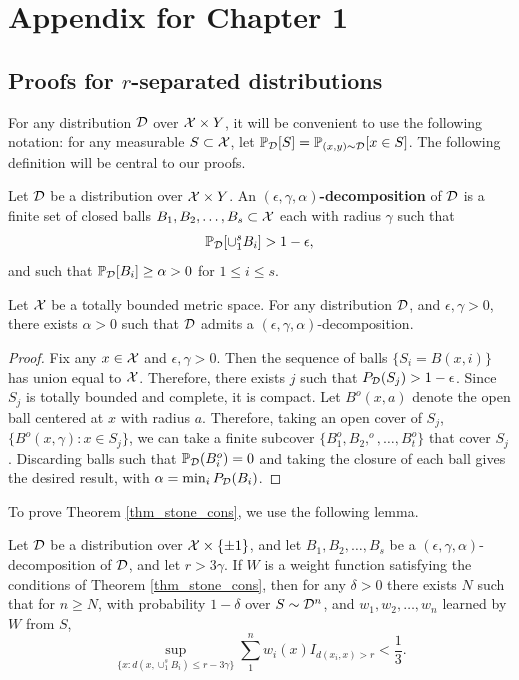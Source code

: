\graphicspath{{./chapters/chapter0/}}
\chapter{Appendix for Chapter 1}
\section{Proofs for $r$-separated distributions}

For any distribution ${\mathcal D}$ over $\mathcal X \times Y$, it will be convenient to use the following notation: for any measurable $S \subset \mathcal X$, let $\mathbb{P}_{\mathcal D}[S] = \mathbb{P}_{(x,y) \sim {\mathcal D}}[x \in S]$. The following definition will be central to our proofs. 

\begin{defn}
Let ${\mathcal D}$ be a distribution over $\mathcal X \times Y$. An \textbf{$(\epsilon, \gamma, \alpha)$-decomposition} of ${\mathcal D}$ is a finite set of closed balls $B_1, B_2, \dots, B_s \subset \mathcal X$ each with radius $\gamma$ such that $$\mathbb{P}_{\mathcal D}[\cup_1^s B_i] > 1 - \epsilon,$$ and such that $\mathbb{P}_{\mathcal D}[B_i] \geq \alpha > 0$ for $1 \leq i \leq s$. 
\end{defn}


\begin{lem}\label{lem_balls}
Let $\mathcal X$ be a totally bounded metric space. For any distribution ${\mathcal D}$, and $\epsilon, \gamma > 0$, there exists $\alpha > 0$ such that ${\mathcal D}$ admits a $(\epsilon, \gamma, \alpha)$-decomposition. 
\end{lem}

\begin{proof}
Fix any $x \in \mathcal X$ and $\epsilon, \gamma > 0$. Then the sequence of balls $\{S_i = B(x, i)\}$ has union equal to $\mathcal X$. Therefore, there exists $j$ such that $P_{\mathcal D}(S_j) > 1 - \epsilon$. Since $S_j$ is totally bounded and complete, it is compact. Let $B^o(x, a)$ denote the open ball centered at $x$ with radius $a$. Therefore, taking an open cover of $S_j$, $\{B^o(x, \gamma): x \in S_j\}$, we can take a finite subcover $\{B_1^o, B_2,^o, \dots, B_t^o\}$ that cover $S_j$. Discarding balls such that $\mathbb{P}_{\mathcal D}(B_i^o) = 0$ and taking the closure of each ball gives the desired result, with $\alpha = \min_{i}P_{\mathcal D}(B_i)$.  
\end{proof}

To prove Theorem \ref{thm_stone_cons}, we use the following lemma. 

\begin{lem}\label{lem_expectation}
Let ${\mathcal D}$ be a distribution over $\mathcal X \times \{\pm 1\}$, and let $B_1, B_2, \dots, B_s$ be a $(\epsilon, \gamma, \alpha)$-decomposition of ${\mathcal D}$, and let $r > 3\gamma$. If $W$ is a weight function satisfying the conditions of Theorem \ref{thm_stone_cons}, then for any $\delta > 0$ there exists $N$ such that for $n \geq N$, with probability $1-\delta$ over $S \sim {\mathcal D}^n$, and $w_1, w_2, \dots, w_n$ learned by $W$ from $S$, $$\sup_{\{x: d(x, \cup_1^s B_i) \leq r - 3\gamma\}} \sum_1^n w_i(x)I_{d(x_i, x) > r} < \frac{1}{3}.$$
\end{lem}


